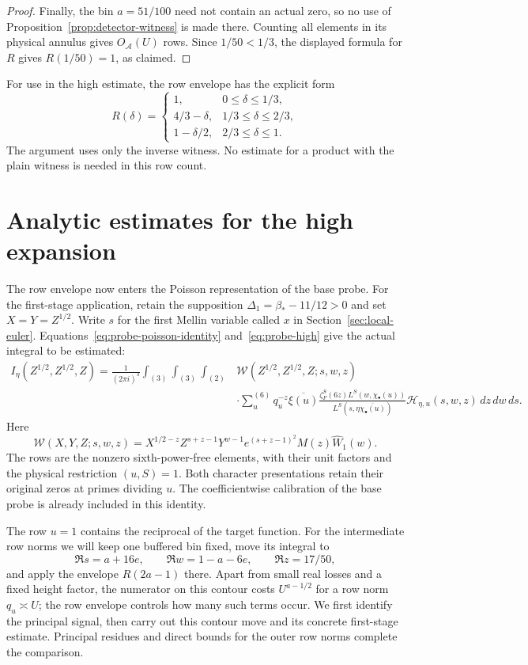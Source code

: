 \documentclass[11pt,a4paper]{article}
\numberwithin{equation}{section}
\numberwithin{figure}{section}
\theoremstyle{definition}
\theoremstyle{remark}
\begin{document}
\begin{proof}
Finally, the bin $a=51/100$ need not contain an actual zero, so no use of
Proposition~\ref{prop:detector-witness} is made there.  Counting all
elements in its physical annulus gives $O_{\mathcal A}(U)$ rows.  Since
$1/50<1/3$, the displayed formula for $R$ gives $R(1/50)=1$, as claimed.
\end{proof}

For use in the high estimate, the row envelope has the explicit form
\[
 R(\delta)=
 \begin{cases}
  1,&0\le\delta\le1/3,\\
  4/3-\delta,&1/3\le\delta\le2/3,\\
  1-\delta/2,&2/3\le\delta\le1.
 \end{cases}
\]
The argument uses only the inverse witness.  No estimate for a product
with the plain witness is needed in this row count.

\section{Analytic estimates for the high expansion}
\label{sec:shared-analytic-estimates}

The row envelope now enters the Poisson representation of the base probe.
For the first-stage application, retain the supposition
$\Delta_1=\beta_*-11/12>0$ and set
$X=Y=Z^{1/2}$.  Write $s$ for the first Mellin variable called $x$ in
Section~\ref{sec:local-euler}.  Equations~\eqref{eq:probe-poisson-identity}
and~\eqref{eq:probe-high} give the actual integral to be estimated:
\[
\begin{split}
 I_\eta(Z^{1/2},Z^{1/2},Z)
 =\frac1{(2\pi i)^3}\int_{(3)}\int_{(3)}\int_{(2)}
 &\mathcal W(Z^{1/2},Z^{1/2},Z;s,w,z)\\
 &\cdot\sum_u^{(6)}q_u^{-z}\overline{\xi(u)}
 \frac{\zeta_F^S(6z)L^S(w,\chi_\bullet(u))}
      {L^S(s,\eta\overline{\chi_\bullet(u)})}
 \mathcal H_{\eta,u}(s,w,z)\,dz\,dw\,ds.
\end{split}
\]
Here
\[
 \mathcal W(X,Y,Z;s,w,z)=X^{1/2-z}Z^{s+z-1}Y^{w-1}
 e^{(s+z-1)^2}M(z)\widehat W_1(w).
\]
The rows are the nonzero sixth-power-free elements, with their unit factors
and the physical restriction $(u,S)=1$.  Both character presentations retain
their original zeros at primes dividing $u$.  The coefficientwise calibration
of the base probe is already included in this identity.

The row $u=1$ contains the reciprocal of the target function.  For the intermediate row norms we will keep one buffered bin fixed, move its integral to
\[
 \Re s=a+16e,\qquad \Re w=1-a-6e,\qquad \Re z=17/50,
\]
and apply the envelope $R(2a-1)$ there.  Apart from small real losses and a fixed height factor, the numerator on
this contour costs $U^{a-1/2}$ for a row norm $q_u\asymp U$; the row envelope controls how many
such terms occur.  We first identify the principal signal, then carry out
this contour move and its concrete first-stage estimate.  Principal residues
and direct bounds for the outer row norms complete the comparison.
\end{document}
